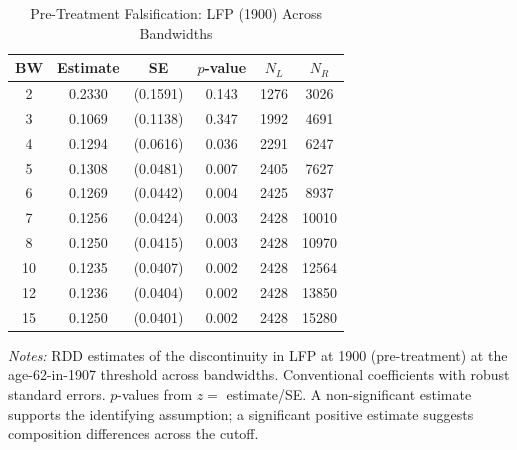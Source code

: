 \begin{table}[htbp]
\centering
\caption{Pre-Treatment Falsification: LFP (1900) Across Bandwidths}
\label{tab:falsif_bw}
\begin{tabular}{cccccc}
\toprule
  BW & Estimate & SE & $p$-value & $N_L$ & $N_R$ \\
\midrule
  2 & 0.2330 & (0.1591) & 0.143 & 1276 & 3026 \\
  3 & 0.1069 & (0.1138) & 0.347 & 1992 & 4691 \\
  4 & 0.1294 & (0.0616) & 0.036 & 2291 & 6247 \\
  5 & 0.1308 & (0.0481) & 0.007 & 2405 & 7627 \\
  6 & 0.1269 & (0.0442) & 0.004 & 2425 & 8937 \\
  7 & 0.1256 & (0.0424) & 0.003 & 2428 & 10010 \\
  8 & 0.1250 & (0.0415) & 0.003 & 2428 & 10970 \\
  10 & 0.1235 & (0.0407) & 0.002 & 2428 & 12564 \\
  12 & 0.1236 & (0.0404) & 0.002 & 2428 & 13850 \\
  15 & 0.1250 & (0.0401) & 0.002 & 2428 & 15280 \\
\bottomrule
\end{tabular}
\begin{tablenotes}[flushleft]
\small
\item \textit{Notes:} RDD estimates of the discontinuity in LFP at 1900 (pre-treatment) at the age-62-in-1907 threshold across bandwidths. Conventional coefficients with robust standard errors. $p$-values from $z = $ estimate/SE. A non-significant estimate supports the identifying assumption; a significant positive estimate suggests composition differences across the cutoff.
\end{tablenotes}
\end{table}

